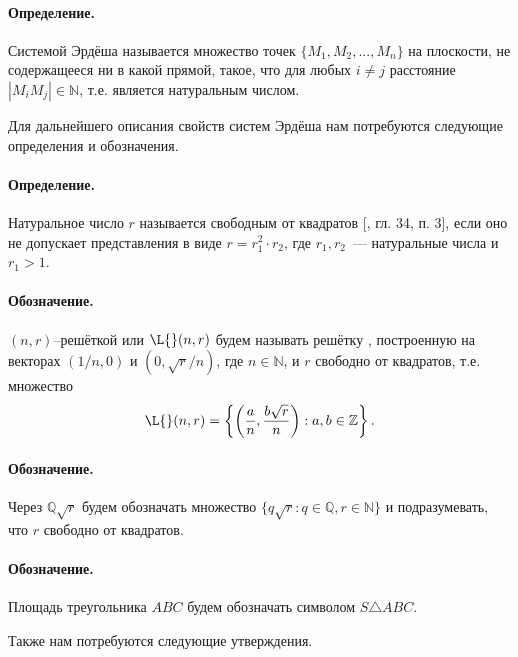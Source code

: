 \documentclass[a4paper,14pt]{article} %
\begin{document}
\renewcommand{\bibname}{Список цитированной литературы}
\renewcommand\refname{\bibname}

\paragraph{Определение.}
Системой Эрдёша называется множество точек $\{M_1, M_2, ..., M_n\}$ на плоскости, не содержащееся ни в какой прямой,
такое, что для любых $i\neq j$ расстояние $|M_i M_j| \in \mathbb{N}$,
т.е. является натуральным числом.

Для дальнейшего описания свойств систем Эрдёша нам потребуются следующие определения и обозначения.

\paragraph{Определение.}
Натуральное число $r$ называется свободным от квадратов [\cite{Bukhstab-number-theory}, гл. 34, п. 3], если оно не допускает представления в виде $r = r_1^2 \cdot r_2$,
где $r_1, r_2$~--- натуральные числа и $r_1 > 1$.

\paragraph{Обозначение.}
$(n,r)$--решёткой или $\L{}(n,r)$ будем называть решётку \cite{polygons-on-lattices},
построенную на векторах $(1/n, 0)$ и $(0, \sqrt{r}/n)$,
где $n\in\mathbb{N}$, и $r$ свободно от квадратов,
т.е. множество
\begin{equation}
	\L{}(n,r) = \left\{
		\left( \frac{a}{n}, \frac{b\sqrt{r}}{n} \right):
		a,b \in \mathbb{Z}
	\right\}.
\end{equation}

\paragraph{Обозначение.}
Через $\mathbb{Q}\sqrt{r}$ будем обозначать множество $\{q\sqrt{r} : q \in \mathbb{Q}, r\in\mathbb{N}\}$
и подразумевать, что $r$ свободно от квадратов.

\paragraph{Обозначение.}
Площадь треугольника $ABC$ будем обозначать символом $S\triangle ABC$.

Также нам потребуются следующие утверждения.
\end{document}
